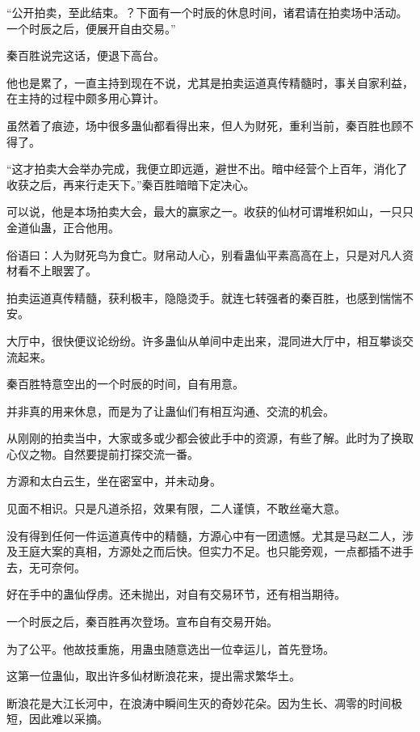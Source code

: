 
\begin{this_body}

“公开拍卖，至此结束。？下面有一个时辰的休息时间，诸君请在拍卖场中活动。一个时辰之后，便展开自由交易。”

秦百胜说完这话，便退下高台。

他也是累了，一直主持到现在不说，尤其是拍卖运道真传精髓时，事关自家利益，在主持的过程中颇多用心算计。

虽然着了痕迹，场中很多蛊仙都看得出来，但人为财死，重利当前，秦百胜也顾不得了。

“这才拍卖大会举办完成，我便立即远遁，避世不出。暗中经营个上百年，消化了收获之后，再来行走天下。”秦百胜暗暗下定决心。

可以说，他是本场拍卖大会，最大的赢家之一。收获的仙材可谓堆积如山，一只只金道仙蛊，正合他用。

俗语曰：人为财死鸟为食亡。财帛动人心，别看蛊仙平素高高在上，只是对凡人资材看不上眼罢了。

拍卖运道真传精髓，获利极丰，隐隐烫手。就连七转强者的秦百胜，也感到惴惴不安。

大厅中，很快便议论纷纷。许多蛊仙从单间中走出来，混同进大厅中，相互攀谈交流起来。

秦百胜特意空出的一个时辰的时间，自有用意。

并非真的用来休息，而是为了让蛊仙们有相互沟通、交流的机会。

从刚刚的拍卖当中，大家或多或少都会彼此手中的资源，有些了解。此时为了换取心仪之物。自然要提前打探交流一番。

方源和太白云生，坐在密室中，并未动身。

见面不相识。只是凡道杀招，效果有限，二人谨慎，不敢丝毫大意。

没有得到任何一件运道真传中的精髓，方源心中有一团遗憾。尤其是马赵二人，涉及王庭大案的真相，方源处之而后快。但实力不足。也只能旁观，一点都插不进手去，无可奈何。

好在手中的蛊仙俘虏。还未抛出，对自有交易环节，还有相当期待。

一个时辰之后，秦百胜再次登场。宣布自有交易开始。

为了公平。他故技重施，用蛊虫随意选出一位幸运儿，首先登场。

这第一位蛊仙，取出许多仙材断浪花来，提出需求繁华土。

断浪花是大江长河中，在浪涛中瞬间生灭的奇妙花朵。因为生长、凋零的时间极短，因此难以采摘。


\end{this_body}
